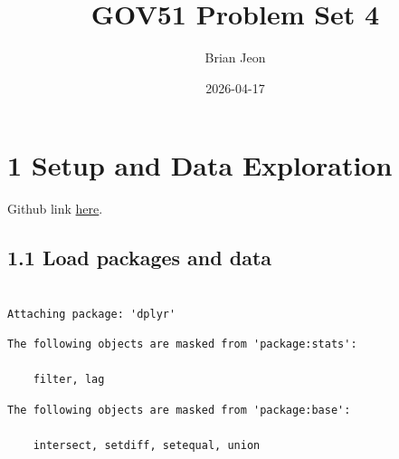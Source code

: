 \documentclass[
  letterpaper,
  DIV=11,
  numbers=noendperiod]{scrartcl}
\title{GOV51 Problem Set 4}
\author{Brian Jeon}
\date{2026-04-17}
\begin{document}
\maketitle


\section{1 Setup and Data Exploration}\label{setup-and-data-exploration}

Github link \href{https://github.com/brianjeon0722/gov51-ps4}{here}.

\subsection{1.1 Load packages and data}\label{load-packages-and-data}

\begin{verbatim}

Attaching package: 'dplyr'
\end{verbatim}

\begin{verbatim}
The following objects are masked from 'package:stats':

    filter, lag
\end{verbatim}

\begin{verbatim}
The following objects are masked from 'package:base':

    intersect, setdiff, setequal, union
\end{verbatim}
\end{document}
